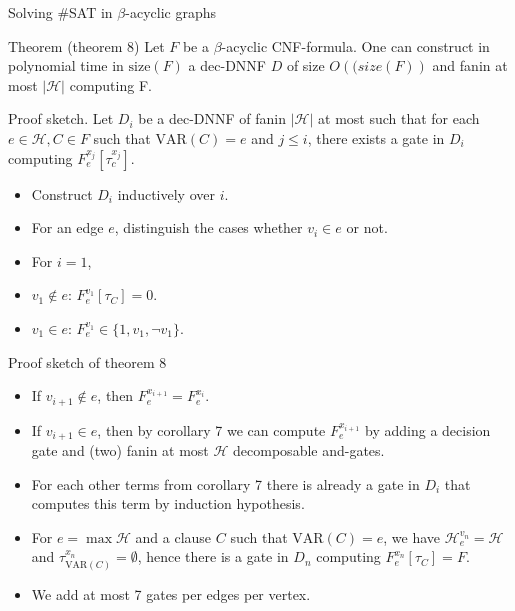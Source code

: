 \begin{frame}[t]{Solving \#SAT in $\beta$-acyclic graphs}
	\begin{block}{Theorem (theorem 8)}
		Let $F$ be a $\beta$-acyclic CNF-formula. One can construct in polynomial time in $\mathrm{size}(F)$ a dec-DNNF $D$ of size $O(\mathrm(size(F))$ and fanin at most $|\mathcal{H}|$ computing F.
	\end{block}
	\pause
	Proof sketch.
	Let $D_i$ be a dec-DNNF of fanin $|\mathcal{H}|$ at most such that for each $e \in \mathcal{H}, C \in F$ such that $\mathrm{VAR}(C) = e$ and $j \leq i$, there exists a gate in $D_i$ computing $F^{x_j}_e[\tau^{x_j}_c]$.
	\pause
	\begin{itemize}[<+->]
		\item Construct $D_i$ inductively over $i$.
		\item For an edge $e$, distinguish the cases whether $v_i \in e$ or not.
		\item For $i=1$,
		\item[]\hspace{1cm}$v_1 \notin e$:  $F^{v_1}_e[\tau_C] = 0$.
		\item[]\hspace{1cm}$v_1 \in e$: $F^{v_1}_e \in \{1, v_1, \lnot v_1\}$.
	\end{itemize}
\end{frame}
\begin{frame}[t]{Proof sketch of theorem 8}
	\begin{itemize}[<+->]
		\item If $v_{i+1} \notin e$, then $F^{x_{i+1}}_e = F^{x_i}_e$.

		\item If $v_{i+1} \in e$, then by corollary 7 we can compute $F^{x_{i+1}}_e$ by adding a decision gate and (two) fanin at most $\mathcal{H}$ decomposable and-gates.
		
		\item[]\hspace{1cm}For each other terms from corollary 7 there is already a gate in $D_i$ that computes this term by induction hypothesis. 
		\item For $e = \max\mathcal{H}$ and a clause $C$ such that $\mathrm{VAR}(C) = e$,  we have $\mathcal{H}^{v_n}_e = \mathcal{H}$ and $\tau^{x_n}_{\mathrm{VAR}(C)} = \emptyset$, hence there is a gate in $D_n$ computing $F^{x_n}_e[\tau_C] = F$.
		\item We add at most 7 gates per edges per vertex.
	\end{itemize}

\end{frame}

